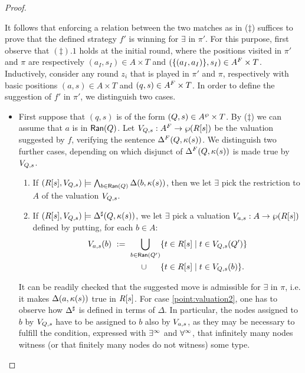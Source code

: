 \begin{proof}
\begin{enumerate}
It follows that enforcing a relation between the two matches as in ($\ddag$) suffices to prove that the defined strategy $f'$ is winning for $\exists$ in $\pi'$. For this purpose, first observe that $(\ddag).1$ holds at the initial round, where the positions visited in $\pi'$ and $\pi$ are respectively $(a_I,s_I) \in A \times T$ and $(\{(a_I,a_I)\},s_I) \in A^{F} \times T$. Inductively, consider any round $z_i$ that is played in $\pi'$ and $\pi$, respectively with basic positions $(a,s) \in A \times T$ and $(q,s) \in A^{F} \times T$. In order to define the suggestion of $f'$ in $\pi'$, we distinguish two cases.
\begin{itemize}
  \item First suppose that $(q,s)$ is of the form $(Q,s) \in
  A^{\wp}\times T$. By ($\ddag$) we can assume that $a$ is in $\mathsf{Ran}(Q)$. Let $V_{Q,s} :A^{F} \rightarrow \wp(R[s])$ be the valuation suggested by $f$, verifying the sentence $\Delta^{F}(Q,\kappa(s))$. We distinguish two further cases, depending on which disjunct of $\Delta^{F}(Q,\kappa(s))$ is made true by $V_{Q,s}$.
      \begin{enumerate}[label=(\roman*), ref=\roman*]
        \item If $(R[s],V_{Q,s})\models \bigwedge_{b \in \mathsf{Ran}(Q)} \Delta(b,\kappa(s))$, then we let $\exists$ pick the restriction to $A$ of the valuation $V_{Q,s}$. \label{point:valuation1}
        \item If $(R[s],V_{Q,s})\models \Delta^{\sharp}(Q,\kappa(s))$, we let $\exists$ pick a valuation $V_{a,s}:A \rightarrow \wp (R[s])$ defined by putting, for each $b \in A$:
            \begin{align*}
               V_{a,s}(b)\ :=\ \bigcup_{b \in \mathsf{Ran}(Q')} &\{t \in R[s] \mid t \in V_{Q,s}(Q')\} \\
               \cup\ \ \ \ \ & \{t \in R[s] \mid t \in V_{Q,s}(b)\} .
            \end{align*} \label{point:valuation2}
      \end{enumerate}
      It can be readily checked that the suggested move is admissible for $\exists$ in $\pi$, i.e. it makes $\Delta(a,\kappa(s))$ true in $R[s]$. For case \eqref{point:valuation2}, one has to observe how $\Delta^{\sharp}$ is defined in terms of $\Delta$. In particular, the nodes assigned to $b$ by $V_{Q,s}$ have to be assigned to $b$ also by $V_{a,s}$, as they may be necessary to fulfill the condition, expressed with $\exists^\infty$ and $\forall^\infty$, that infinitely many nodes witness (or that finitely many nodes do not witness) some type.


\end{itemize}
\end{enumerate}
\end{proof}
